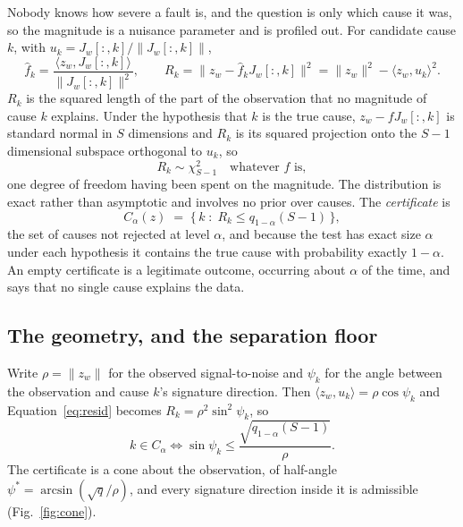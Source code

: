 \documentclass[preprint,12pt]{elsarticle}
\begin{document}
Nobody knows how severe a fault is, and the question is only which cause it was,
so the magnitude is a nuisance parameter and is profiled out. For candidate
cause $k$, with $u_k = J_w[:,k]/\|J_w[:,k]\|$,
%
\begin{equation}
\hat f_k = \frac{\langle z_w, J_w[:,k]\rangle}{\|J_w[:,k]\|^2},
\qquad
R_k = \bigl\| z_w - \hat f_k J_w[:,k] \bigr\|^2
    = \|z_w\|^2 - \langle z_w, u_k\rangle^2 .
\label{eq:resid}
\end{equation}
%
$R_k$ is the squared length of the part of the observation that no magnitude of
cause $k$ explains. Under the hypothesis that $k$ is the true cause,
$z_w - f J_w[:,k]$ is standard normal in $S$ dimensions and $R_k$ is its squared
projection onto the $S-1$ dimensional subspace orthogonal to $u_k$, so
%
\begin{equation}
R_k \sim \chi^2_{S-1} \quad\text{whatever } f \text{ is},
\end{equation}
%
one degree of freedom having been spent on the magnitude. The distribution is
exact rather than asymptotic and involves no prior over causes. The
\emph{certificate} is
%
\begin{equation}
C_\alpha(z) \;=\; \bigl\{\, k \;:\; R_k \le q_{1-\alpha}(S-1) \,\bigr\},
\label{eq:cert}
\end{equation}
%
the set of causes not rejected at level $\alpha$, and because the test has exact
size $\alpha$ under each hypothesis it contains the true cause with probability
exactly $1-\alpha$. An empty certificate is a legitimate outcome, occurring
about $\alpha$ of the time, and says that no single cause explains the data.

\subsection{The geometry, and the separation floor}
\label{sec:floor}

Write $\rho = \|z_w\|$ for the observed signal-to-noise and $\psi_k$ for the
angle between the observation and cause $k$'s signature direction. Then
$\langle z_w, u_k\rangle = \rho\cos\psi_k$ and Equation~\eqref{eq:resid} becomes
$R_k = \rho^2 \sin^2\psi_k$, so
%
\begin{equation}
k \in C_\alpha
\iff
\sin\psi_k \le \frac{\sqrt{q_{1-\alpha}(S-1)}}{\rho} .
\label{eq:cone}
\end{equation}
%
The certificate is a cone about the observation, of half-angle
$\psi^\ast = \arcsin(\sqrt{q}/\rho)$, and every signature direction inside it is
admissible (Fig.~\ref{fig:cone}).
\end{document}
